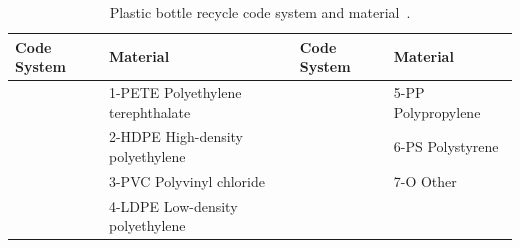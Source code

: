 \documentclass{lutmscthesis}[2010/09/22]
\begin{document}
\begin{table}[hpt]
\begin{center}
\caption{Plastic bottle recycle code system and
         material~\cite{Wahab:2006}.\label{tab:resin_types}}
{\renewcommand{\arraystretch}{2}
\begin{tabular}{C{2cm} | l | C{2cm} | l}

\textbf{Code System} & \textbf{Material} & \textbf{Code System} & \textbf{Material} \\ \hline

& 1-PETE Polyethylene terephthalate &
& 5-PP Polypropylene \\

& 2-HDPE High-density polyethylene &
& 6-PS Polystyrene \\

& 3-PVC Polyvinyl chloride &
& 7-O Other \\

& 4-LDPE Low-density polyethylene &
& \\

\end{tabular}}
\end{center}
\end{table}
\end{document}
